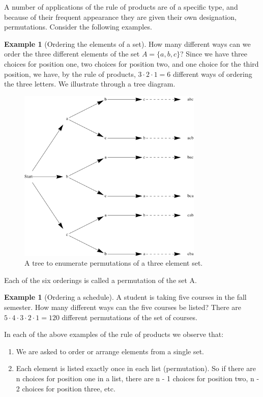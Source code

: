 \documentclass[10pt,]{book}
\theoremstyle{plain}
\theoremstyle{definition}
\newtheorem{example}[theorem]{Example}
\begin{document}
 A number of applications of the rule of products are of a specific type, and because of their frequent appearance they are given their own designation, permutations. Consider the following examples.
%
\begin{example}[Ordering the elements of a set]\label{ordering_a_set}
How many different ways can we order the three different elements of the set \(A = \{a, b, c\}\)? Since we have three choices for position one, two choices for position two, and one choice for the third position, we have, by the rule of products, \(3 \cdot 2 \cdot 1 = 6\) different ways of ordering the three letters. We illustrate through a tree diagram.%
\leavevmode%
\begin{figure}
\centering
\includegraphics[width=250pt,]{images/tree-of-permutations.svg}\caption{A tree to enumerate permutations of a three element set.
                \label{tree-of-permutations}}
\end{figure}
\par

 Each of the six orderings is called a permutation of the set A.
%
\end{example}
\begin{example}[Ordering a schedule]\label{ordering_a_schedule}
A student is taking five courses in the fall semester. How many different ways can the five courses be listed? There are \(5 \cdot 4 \cdot 3 \cdot 2 \cdot 1 = 120\) different permutations of the set of courses.%
\end{example}
\par

 In each of the above examples of the rule of products we observe that:
\leavevmode%
\begin{enumerate}
\item\hypertarget{li-204}{}
We are asked to order or arrange elements from a single set.\item\hypertarget{li-205}{}
Each element is listed exactly once in each list (permutation). So if there are n choices for position one in a list, there are n - 1 choices for position two, n - 2 choices for position three, etc.\end{enumerate}
\end{document}
